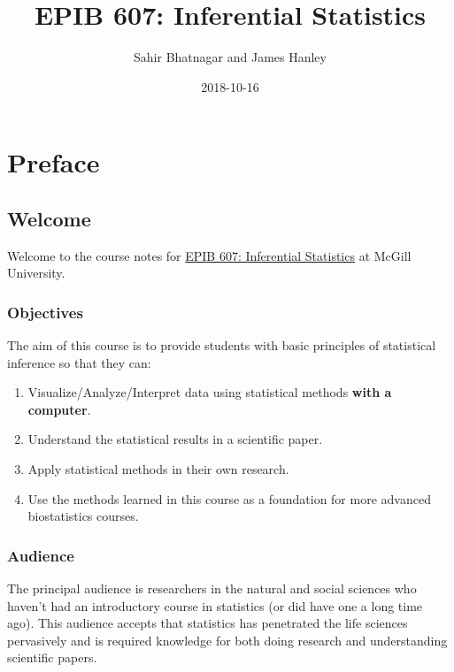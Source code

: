 \documentclass[]{book}
\title{EPIB 607: Inferential Statistics}
\author{Sahir Bhatnagar and James Hanley}
\date{2018-10-16}
\providecommand{\tightlist}{%
  \setlength{\itemsep}{0pt}\setlength{\parskip}{0pt}}
\providecommand{\tightlist}{%
  \setlength{\itemsep}{0pt}\setlength{\parskip}{0pt}}
\theoremstyle{definition}
\theoremstyle{definition}
\theoremstyle{definition}
\theoremstyle{remark}
\begin{document}
\maketitle

{
\setcounter{tocdepth}{1}
\tableofcontents
}
\part{Preface}\label{part-preface}

\chapter{Welcome}\label{welcome}

Welcome to the course notes for
\href{https://www.mcgill.ca/study/2018-2019/courses/epib-607}{EPIB 607:
Inferential Statistics} at McGill University.

\section{Objectives}\label{objectives}

The aim of this course is to provide students with basic principles of
statistical inference so that they can:

\begin{enumerate}
\def\labelenumi{\arabic{enumi}.}
\tightlist
\item
  Visualize/Analyze/Interpret data using statistical methods
  \textbf{with a computer}.
\item
  Understand the statistical results in a scientific paper.\\
\item
  Apply statistical methods in their own research.\\
\item
  Use the methods learned in this course as a foundation for more
  advanced biostatistics courses.
\end{enumerate}

\section{Audience}\label{audience}

The principal audience is researchers in the natural and social sciences
who haven't had an introductory course in statistics (or did have one a
long time ago). This audience accepts that statistics has penetrated the
life sciences pervasively and is required knowledge for both doing
research and understanding scientific papers.
\end{document}
